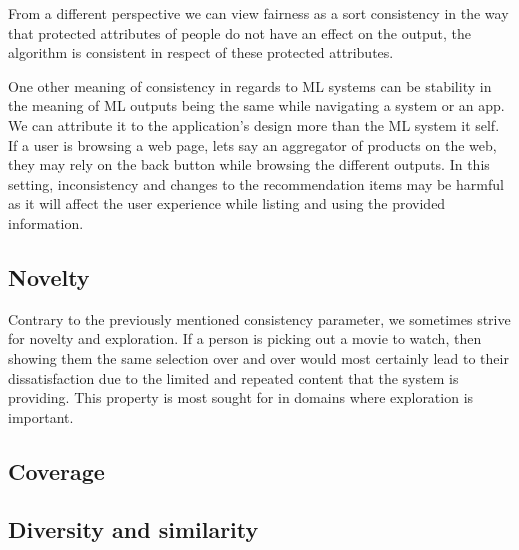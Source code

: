 From a different perspective we can view fairness as a sort consistency in the way that protected attributes of people do not have an effect on the output, the algorithm is consistent in respect of these protected attributes.


One other meaning of consistency in regards to ML systems can be stability in the meaning of ML outputs being the same while navigating a system or an app. We can attribute it to the application's design more than the ML system it self. If a user is browsing a web page, lets say an aggregator of products on the web, they may rely on the back button while browsing the different outputs. In this setting, inconsistency and changes to the recommendation items may be harmful as it will affect the user experience while listing and using the provided information.

\subsection{Novelty}
Contrary to the previously mentioned consistency parameter, we sometimes strive for novelty and exploration. If a person is picking out a movie to watch, then showing them the same selection over and over would most certainly lead to their dissatisfaction due to the limited and repeated content that the system is providing. This property is most sought for in domains where exploration is important.

\subsection{Coverage}
\subsection{Diversity and similarity}

